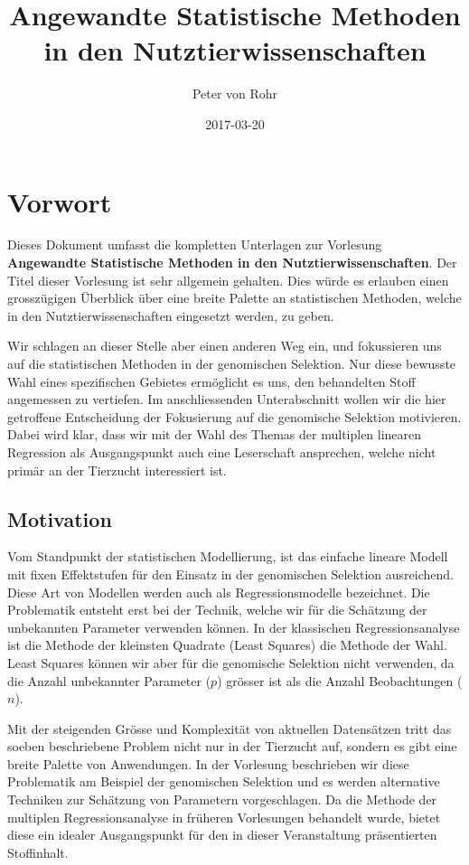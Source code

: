 \documentclass[]{book}
\title{Angewandte Statistische Methoden in den Nutztierwissenschaften}
\author{Peter von Rohr}
\date{2017-03-20}
\begin{document}
\maketitle

{
\setcounter{tocdepth}{1}
\tableofcontents
}
\chapter*{Vorwort}\label{vorwort}

Dieses Dokument umfasst die kompletten Unterlagen zur Vorlesung
\textbf{Angewandte Statistische Methoden in den Nutztierwissenschaften}.
Der Titel dieser Vorlesung ist sehr allgemein gehalten. Dies würde es
erlauben einen grosszügigen Überblick über eine breite Palette an
statistischen Methoden, welche in den Nutztierwissenschaften eingesetzt
werden, zu geben.

Wir schlagen an dieser Stelle aber einen anderen Weg ein, und
fokussieren uns auf die statistischen Methoden in der genomischen
Selektion. Nur diese bewusste Wahl eines spezifischen Gebietes
ermöglicht es uns, den behandelten Stoff angemessen zu vertiefen. Im
anschliessenden Unterabschnitt wollen wir die hier getroffene
Entscheidung der Fokusierung auf die genomische Selektion motivieren.
Dabei wird klar, dass wir mit der Wahl des Themas der multiplen linearen
Regression als Ausgangspunkt auch eine Leserschaft ansprechen, welche
nicht primär an der Tierzucht interessiert ist.

\section*{Motivation}\label{motivation}

Vom Standpunkt der statistischen Modellierung, ist das einfache lineare
Modell mit fixen Effektstufen für den Einsatz in der genomischen
Selektion ausreichend. Diese Art von Modellen werden auch als
Regressionsmodelle bezeichnet. Die Problematik entsteht erst bei der
Technik, welche wir für die Schätzung der unbekannten Parameter
verwenden können. In der klassischen Regressionsanalyse ist die Methode
der kleinsten Quadrate (Least Squares) die Methode der Wahl. Least
Squares können wir aber für die genomische Selektion nicht verwenden, da
die Anzahl unbekannter Parameter (\(p\)) grösser ist als die Anzahl
Beobachtungen (\(n\)).

Mit der steigenden Grösse und Komplexität von aktuellen Datensätzen
tritt das soeben beschriebene Problem nicht nur in der Tierzucht auf,
sondern es gibt eine breite Palette von Anwendungen. In der Vorlesung
beschrieben wir diese Problematik am Beispiel der genomischen Selektion
und es werden alternative Techniken zur Schätzung von Parametern
vorgeschlagen. Da die Methode der multiplen Regressionsanalyse in
früheren Vorlesungen behandelt wurde, bietet diese ein idealer
Ausgangspunkt für den in dieser Veranstaltung präsentierten Stoffinhalt.
\end{document}
